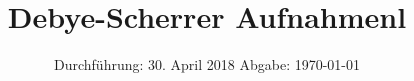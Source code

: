 

\subject{V-41}
\title{Debye-Scherrer Aufnahmenl}
\date{
  Durchführung: 30. April 2018
  \hspace{3em}
  Abgabe: \today
}



\maketitle
\thispagestyle{empty}
\tableofcontents
\newpage






\printbibliography


